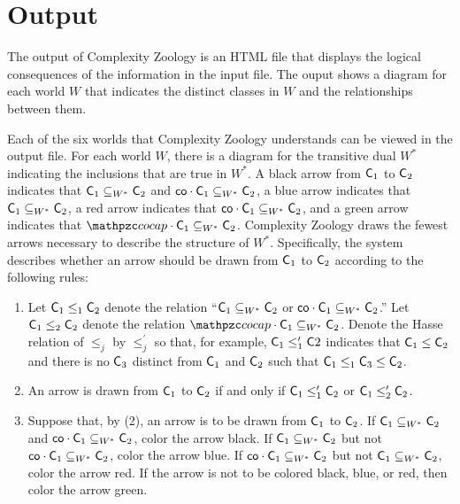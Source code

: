 \section{Output}

The output of Complexity Zoology is an HTML file that displays the logical
consequences of the information in the input file. The ouput shows a diagram for
each world $W$ that indicates the distinct classes in $W$ and the relationships
between them.

Each of the six worlds that Complexity Zoology understands can be viewed in the
output file. For each world $W$, there is a diagram for the transitive dual
$W^*$ indicating the inclusions that are true in $W^*$. A black arrow from
$\mathsf{C}_1$ to $\mathsf{C}_2$ indicates that $\mathsf{C}_1\subseteq_{W^*}\mathsf{C}_2$ and
$\mathsf{co}\cdot\mathsf{C}_1\subseteq_{W^*}\mathsf{C}_2$, a blue arrow indicates that
$\mathsf{C}_1\subseteq_{W^*}\mathsf{C}_2$, a red arrow indicates that
$\mathsf{co}\cdot\mathsf{C}_1\subseteq_{W^*}\mathsf{C}_2$, and a green arrow indicates that
$\cocap\cdot\sC_1\subseteq_{W^*}\sC_2$. Complexity Zoology draws the fewest
arrows necessary to describe the structure of $W^*$. Specifically, the system
describes whether an arrow should be drawn from $\mathsf{C}_1$ to $\mathsf{C}_2$ according to
the following rules:
\begin{enumerate}
\item Let $\mathsf{C}_1\leq_1\mathsf{C}_2$ denote the relation ``$\mathsf{C}_1\subseteq_{W^*}\mathsf{C}_2$
  or $\mathsf{co}\cdot\mathsf{C}_1\subseteq_{W^*}\mathsf{C}_2$.'' Let $\mathsf{C}_1\leq_2\mathsf{C}_2$ denote the
  relation $\cocap\cdot\sC_1\subseteq_{W^*}\sC_2$. Denote the Hasse relation of
  $\leq_j$ by $\leq_j^\prime$ so that, for example, $\mathsf{C}_1\leq_1^\prime\mathsf{C}2$
  indicates that $\mathsf{C}_1\leq\mathsf{C}_2$ and there is no $\mathsf{C}_3$ distinct from $\mathsf{C}_1$
  and $\mathsf{C}_2$ such that $\mathsf{C}_1\leq_1\mathsf{C}_3\leq\mathsf{C}_2$.
\item An arrow is drawn from $\mathsf{C}_1$ to $\mathsf{C}_2$ if and only if
  $\mathsf{C}_1\leq_1^\prime\mathsf{C}_2$ or $\mathsf{C}_1\leq_2^\prime\mathsf{C}_2$.
\item Suppose that, by (2), an arrow is to be drawn from $\mathsf{C}_1$ to $\mathsf{C}_2$. If
  $\mathsf{C}_1\subseteq_{W^*}\mathsf{C}_2$ and $\mathsf{co}\cdot\mathsf{C}_1\subseteq_{W^*}\mathsf{C}_2$, color the
  arrow black. If $\mathsf{C}_1\subseteq_{W^*}\mathsf{C}_2$ but not
  $\mathsf{co}\cdot\mathsf{C}_1\subseteq_{W^*}\mathsf{C}_2$, color the arrow blue. If
  $\mathsf{co}\cdot\mathsf{C}_1\subseteq_{W^*}\mathsf{C}_2$ but not $\mathsf{C}_1\subseteq_{W^*}\mathsf{C}_2$, color
  the arrow red. If the arrow is not to be colored black, blue, or red, then
  color the arrow green.
\end{enumerate}

